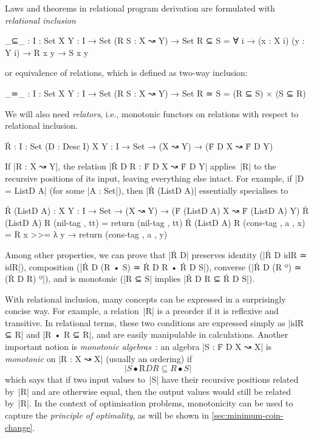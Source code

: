Laws and theorems in relational program derivation are formulated with \emph{relational inclusion}
\begin{code}
_⊆_ : {I : Set} {X Y : I → Set} (R S : X ↝ Y) → Set
R ⊆ S = ∀ {i} → (x : X i) (y : Y i) → R x y → S x y
\end{code}
or equivalence of relations, which is defined as two-way inclusion:
\begin{code}
_≃_ : {I : Set} {X Y : I → Set} (R S : X ↝ Y) → Set
R ≃ S = (R ⊆ S) × (S ⊆ R)
\end{code}
We will also need \emph{relators}, i.e., monotonic functors on relations with respect to relational inclusion.
\begin{code}
Ṙ :  {I : Set} (D : Desc I) {X Y : I → Set} →
     (X ↝ Y) → (Ḟ D X ↝ Ḟ D Y)
\end{code}
If |R : X ↝ Y|, the relation |Ṙ D R : Ḟ D X ↝ Ḟ D Y| applies~|R| to the recursive positions of its input, leaving everything else intact.
For example, if |D = ListD A| (for some |A : Set|), 
then |Ṙ (ListD A)| essentially specialises to
\begin{code}
Ṙ (ListD A) :  {X Y : I → Set} →
               (X ↝ Y) → (Ḟ (ListD A) X ↝ Ḟ (ListD A) Y)
Ṙ (ListD A) R (nil-tag   , tt)     =  return (nil-tag , tt)
Ṙ (ListD A) R (cons-tag  , a , x)  =  R x >>= λ y → return (cons-tag , a , y)
\end{code}
Among other properties, we can prove that |Ṙ D| preserves identity (|Ṙ D idR ≃ idR|), composition (|Ṙ D (R • S) ≃ Ṙ D R • Ṙ D S|), converse (|Ṙ D (R º) ≃ (Ṙ D R) º|), and is monotonic (|R ⊆ S| implies |Ṙ D R ⊆ Ṙ D S|).

With relational inclusion, many concepts can be expressed in a surprisingly concise way.
For example, a relation~|R| is a preorder if it is reflexive and transitive.
In relational terms, these two conditions are expressed simply as |idR ⊆ R| and |R • R ⊆ R|, and are easily manipulable in calculations.
Another important notion is \emph{monotonic algebras}~\cite[Section 7.2]{Bird-AoP}: an algebra |S : Ḟ D X ↝ X| is \emph{monotonic} on |R : X ↝ X| (usually an ordering) if
\[ |S • Ṙ D R ⊆ R • S| \]
which says that if two input values to~|S| have their recursive positions related by~|R| and are otherwise equal, then the output values would still be related by~|R|.
In the context of optimisation problems, monotonicity can be used to capture the \emph{principle of optimality}, as will be shown in \autoref{sec:minimum-coin-change}.


